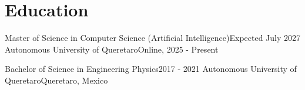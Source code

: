 \section{Education}
    \resumeSubHeadingListStart
    \resumeSubheading
    {Master of Science in Computer Science (Artificial Intelligence)}{Expected July 2027}
    {Autonomous University of Queretaro}{Online, 2025 - Present}

    \resumeSubheading
    {Bachelor of Science in Engineering Physics}{2017 - 2021}
    {Autonomous University of Queretaro}{Queretaro, Mexico}
    \resumeSubHeadingListEnd
